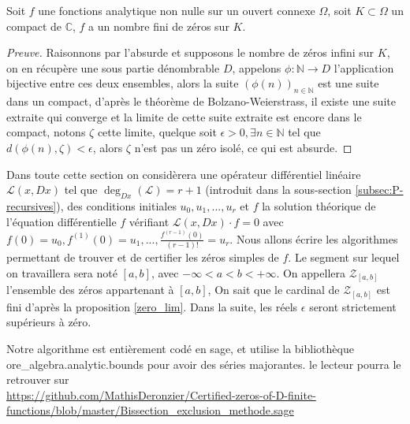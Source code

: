 \documentclass[a4paper,10pt]{article}
\begin{document}
	\begin{proposition}
		Soit $f$ une fonctions analytique non nulle sur un ouvert connexe $\Omega$, soit $K \subset \Omega$ un compact de $\mathbb{C}$, $f$ a un nombre fini de zéros sur $K$.
		\label{zero_lim}
	\end{proposition}
	\begin{proof}[Preuve]
		Raisonnons par l'absurde et supposons le nombre de zéros infini sur $K$, on en récupère une sous partie dénombrable $D$, appelons $\phi:\mathbb{N}\rightarrow D$ l'application bijective entre ces deux ensembles, alors la suite $(\phi(n))_{n\in\mathbb{N}}$ est une suite dans un compact, d'après le théorème de Bolzano-Weierstrass, il existe une suite extraite qui converge et la limite de cette suite extraite est encore dans le compact, notons $\zeta$ cette limite, quelque soit $\epsilon>0, \exists n \in \mathbb{N}$ tel que $d(\phi(n),\zeta)<\epsilon$, alors $\zeta$ n'est pas un zéro isolé, ce qui est absurde.
	\end{proof}

	Dans toute cette section on considèrera une opérateur différentiel linéaire $\mathcal{L}(x,Dx)$ tel que $\deg_{Dx}(\mathcal{L})=r+1$ (introduit dans la sous-section \autoref{subsec:P-recursives}), des conditions initiales $u_0,u_1,...,u_r$ et $f$ la solution théorique de l'équation différentielle $f$ vérifiant $\mathcal{L}(x,Dx)\cdot f=0$ avec $f(0)=u_0,f^{(1)}(0)=u_1,...,\frac{f^{(r-1)}(0)}{(r-1)!}=u_r$. Nous allons écrire les algorithmes permettant de trouver et de certifier les zéros simples de $f$. Le segment sur lequel on travaillera sera  noté $[a,b]$, avec $-\infty<a<b<+\infty$. On appellera $\mathcal{Z}_{[a,b]}$ l'ensemble des zéros appartenant à $[a,b]$, On sait que le cardinal de $\mathcal{Z}_{[a,b]}$ est fini d'après la proposition \ref{zero_lim}. Dans la suite, les réels $\epsilon$ seront strictement supérieurs à zéro.
	
	\vspace{7mm}
	\noindent Notre algorithme est entièrement codé en sage, et utilise la bibliothèque ore\_algebra.analytic.bounds pour avoir des séries majorantes. le lecteur pourra le retrouver sur\\
	\url{https://github.com/MathisDeronzier/Certified-zeros-of-D-finite-functions/blob/master/Bissection_exclusion_methode.sage}
\end{document}
